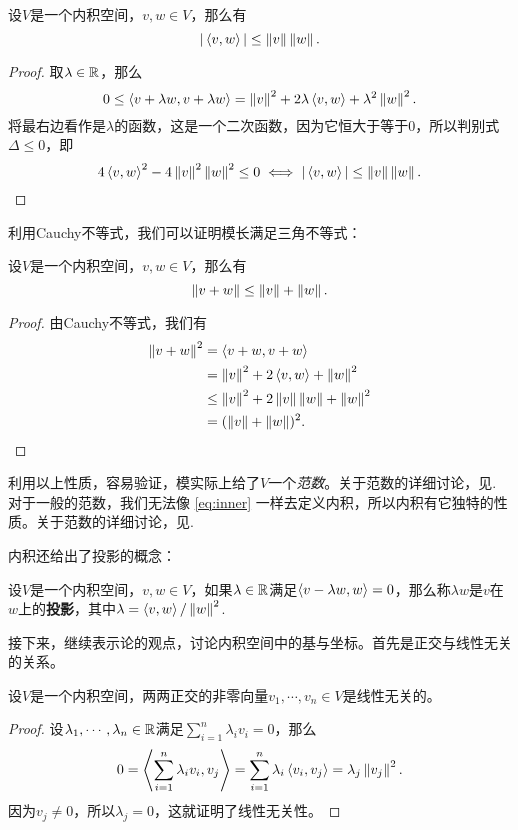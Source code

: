 \begin{theorem}[Cauchy不等式]\label{thm:cauchy}
设$V$是一个内积空间，$v,w\in V$，那么有
\[
    |\left\langle{v},{w}\right\rangle|\leq \left\|v\right\|\left\|w\right\|.
\]
\end{theorem}

\begin{proof}
    取$\lambda\in \mathbb{R}$，那么
    \[
        0\leq \left\langle{v+\lambda w},{v+\lambda w}\right\rangle=\left\|v\right\|^2+2\lambda\left\langle{v},{w}\right\rangle+\lambda^2\left\|w\right\|^2.
    \]
将最右边看作是$\lambda$的函数，这是一个二次函数，因为它恒大于等于$0$，所以判别式$\Delta\leq 0$，即
\[
    4\left\langle{v},{w}\right\rangle^2-4\left\|v\right\|^2\left\|w\right\|^2\leq 0\iff |\left\langle{v},{w}\right\rangle|\leq \left\|v\right\|\left\|w\right\|.
\]
\end{proof}

利用Cauchy不等式，我们可以证明模长满足三角不等式：
\begin{theorem}[三角不等式]\label{thm:triangle}
设$V$是一个内积空间，$v,w\in V$，那么有
\[
    \left\|v+w\right\|\leq \left\|v\right\|+\left\|w\right\|.
\]
\end{theorem}

\begin{proof}
由Cauchy不等式，我们有
\begin{align*}
    \left\|v+w\right\|^2 &= \left\langle{v+w},{v+w}\right\rangle \\
    &= \left\|v\right\|^2+2\left\langle{v},{w}\right\rangle+\left\|w\right\|^2 \\
    &\leq \left\|v\right\|^2+2\left\|v\right\|\left\|w\right\|+\left\|w\right\|^2 \\
    &= (\left\|v\right\|+\left\|w\right\|)^2.
\end{align*}
\end{proof}
利用以上性质，容易验证，模实际上给了$V$一个\emph{范数}。关于范数的详细讨论，见. 对于一般的范数，我们无法像 \eqref{eq:inner} 一样去定义内积，所以内积有它独特的性质。关于范数的详细讨论，见.


内积还给出了投影的概念：

\begin{definition}[投影]
设$V$是一个内积空间，$v,w\in V$，如果$\lambda\in\mathbb{R}$满足$\left\langle{v-\lambda w},{w}\right\rangle=0$，那么称$\lambda w$是$v$在$w$上的\textbf{投影}，其中$\lambda=\left\langle{v},{w}\right\rangle/\left\|w\right\|^2$.
\end{definition}

接下来，继续表示论的观点，讨论内积空间中的基与坐标。首先是正交与线性无关的关系。

\begin{proposition}\label{prop:orthogonal}
设$V$是一个内积空间，两两正交的非零向量$v_1,\cdots,v_n\in V$是线性无关的。
\end{proposition}
\begin{proof}
设$\lambda_1,\cdots,\lambda_n\in\mathbb{R}$满足$\sum_{i=1}^n\lambda_iv_i=0$，那么
\[
    0=\left\langle{\sum_{i=1}^n\lambda_iv_i},{v_j}\right\rangle=\sum_{i=1}^n\lambda_i\left\langle{v_i},{v_j}\right\rangle=\lambda_j\left\|v_j\right\|^2.
\]
因为$v_j\neq 0$，所以$\lambda_j=0$，这就证明了线性无关性。
\end{proof}


